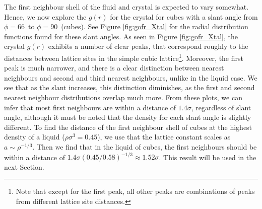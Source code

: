 \documentclass[thesis]{subfiles}
\begin{document}
The first neighbour shell of the fluid and crystal is expected to vary somewhat. Hence, we now explore the $g(r)$ for the crystal for cubes with a slant angle from $\phi = 66$\degr\ to $\phi = 90$\degr\ (cubes). See Figure \ref{fig:gofr_Xtal} for the radial distribution functions found for these slant angles. As seen in Figure \ref{fig:gofr_Xtal}, the crystal $g(r)$ exhibits a number of clear peaks, that correspond roughly to the distances between lattice sites in the simple cubic lattice\footnote{Note that except for the first peak, all other peaks are combinations of peaks from different lattice site distances.}. Moreover, the first peak is much narrower, and there is a clear distinction between nearest neighbours and second and third nearest neighbours, unlike in the liquid case. We see that as the slant increases, this distinction diminishes, as the first and second nearest neighbour distributions overlap much more. From these plots, we can infer that most first neighbours are within a distance of $1.4\sigma$, regardless of slant angle, although it must be noted that the density for each slant angle is slightly different. To find the distance of the first neighbour shell of cubes at the highest density of a liquid ($\rho \sigma^3 = 0.45$)\cite{van2017phase}, we use that the lattice constant scales as $a \sim \rho^{-1/3}$. Then we find that in the liquid of cubes, the first neighbours should be within a distance of $1.4\sigma (0.45/0.58)^{-1/3} \approx 1.52\sigma$. This result will be used in the next Section.
\end{document}
